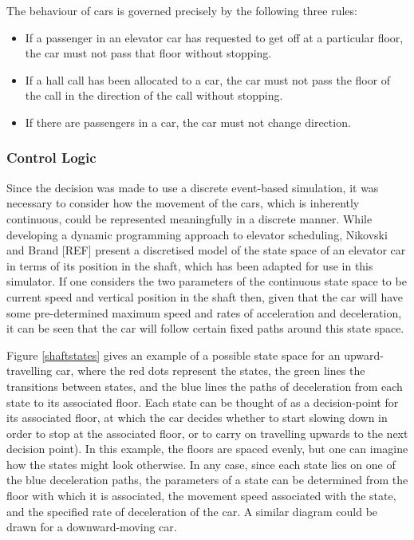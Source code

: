 \documentclass{UoYCSproject}
\begin{document}
The behaviour of cars is governed precisely by the following three rules:
\begin{itemize}
	\item If a passenger in an elevator car has requested to get off at a particular floor, the car must not pass that floor without stopping.
	\item If a hall call has been allocated to a car, the car must not pass the floor of the call in the direction of the call without stopping.
	\item If there are passengers in a car, the car must not change direction.
\end{itemize}

\subsubsection{Control Logic}

Since the decision was made to use a discrete event-based simulation, it was necessary to consider how the movement of the cars, which is inherently continuous, could be represented meaningfully in a discrete manner.  While developing a dynamic programming approach to elevator scheduling, Nikovski and Brand [REF] present a discretised model of the state space of an elevator car in terms of its position in the shaft, which has been adapted for use in this simulator.  If one considers the two parameters of the continuous state space to be current speed and vertical position in the shaft then, given that the car will have some pre-determined maximum speed and rates of acceleration and deceleration, it can be seen that the car will follow certain fixed paths around this state space.  

Figure \ref{shaftstates} gives an example of a possible state space for an upward-travelling car, where the red dots represent the states, the green lines the transitions between states, and the blue lines the paths of deceleration from each state to its associated floor.  Each state can be thought of as a decision-point for its associated floor, at which the car decides whether to start slowing down in order to stop at the associated floor, or to carry on travelling upwards to the next decision point).  In this example, the floors are spaced evenly, but one can imagine how the states might look otherwise.  In any case, since each state lies on one of the blue deceleration paths, the parameters of a state can be determined from the floor with which it is associated, the movement speed associated with the state, and the specified rate of deceleration of the car.  A similar diagram could be drawn for a downward-moving car.
\end{document}

